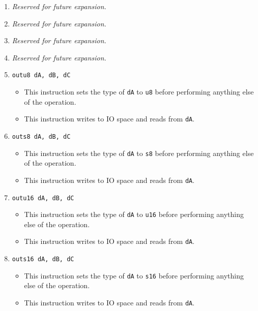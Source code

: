 \documentclass{article}
\begin{document}
\begin{itemize}
\begin{enumerate}
			\item \textit{Reserved for future expansion.}
			\item \textit{Reserved for future expansion.}
			\item \textit{Reserved for future expansion.}
			\item \textit{Reserved for future expansion.}
			\item \texttt{outu8 dA, dB, dC}
				\begin{itemize}
				\item This instruction sets the type of \texttt{dA} to
					\texttt{u8} before performing anything else of the
					operation.
				\item This instruction writes to IO space and reads from
					\texttt{dA}.
				\end{itemize}
			\item \texttt{outs8 dA, dB, dC}
				\begin{itemize}
				\item This instruction sets the type of \texttt{dA} to
					\texttt{s8} before performing anything else of the
					operation.
				\item This instruction writes to IO space and reads from
					\texttt{dA}.
				\end{itemize}
			\item \texttt{outu16 dA, dB, dC}
				\begin{itemize}
				\item This instruction sets the type of \texttt{dA} to
					\texttt{u16} before performing anything else of the
					operation.
				\item This instruction writes to IO space and reads from
					\texttt{dA}.
				\end{itemize}
			\item \texttt{outs16 dA, dB, dC}
				\begin{itemize}
				\item This instruction sets the type of \texttt{dA} to
					\texttt{s16} before performing anything else of the
					operation.
				\item This instruction writes to IO space and reads from
					\texttt{dA}.
				\end{itemize}


\end{enumerate}
\end{itemize}
\end{document}
